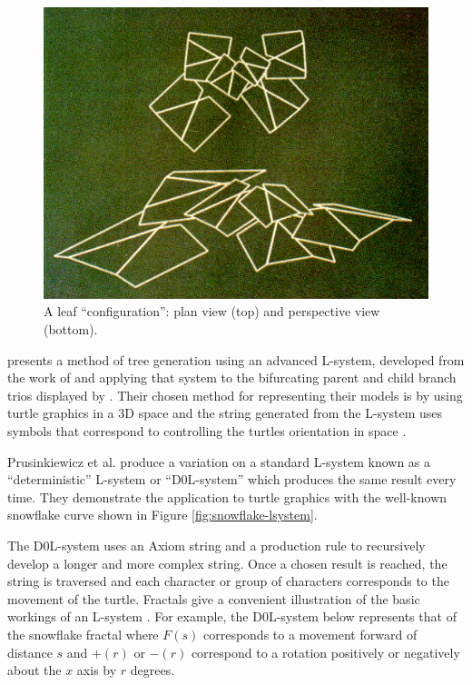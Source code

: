 \documentclass[final]{cmpreport}
\begin{document}
\begin{figure}[ht]
    \includegraphics[scale=0.24]{bloomenthal-leaves.PNG} 
    \centering
    \captionsetup{justification=centering}
    \caption{A leaf ``configuration'': plan view (top) and perspective view (bottom).}
    \label{fig:bloomenthal-leaves}
\end{figure}

\cite{prusinkiewicz1996systems} presents a method of tree generation using an advanced 
L-system, developed from the work of \cite{lindenmayer1968mathematical1} and applying 
that system to the bifurcating parent and child branch trios displayed by \cite{honda1971description}.
Their chosen method for representing their models is by using turtle graphics in a 3D 
space and the string generated from the L-system uses symbols that correspond to controlling 
the turtles orientation in space \citep{szilard1979interpretation,prusinkiewicz1986graphical}.

Prusinkiewicz et al. produce a variation on a standard L-system known as a ``deterministic''
L-system or ``D0L-system'' which produces the same result every time. They demonstrate the 
application to turtle graphics with the well-known snowflake curve \citep{mandelbrot1982fractal,koch1906methode} 
shown in Figure \ref{fig:snowflake-lsystem}.

The D0L-system uses an Axiom string and a production rule to recursively develop a longer and 
more complex string. Once a chosen result is reached, the string is traversed and each character 
or group of characters corresponds to the movement of the turtle. Fractals give a convenient 
illustration of the basic workings of an L-system \citep{prusinkiewicz1986graphical,prusinkiewicz2012algorithmic}. 
For example, the D0L-system below represents that of the snowflake fractal where $F(s)$ 
corresponds to a movement forward of distance $s$ and $+(r)$ or $-(r)$ correspond to a rotation 
positively or negatively about the $x$ axis by $r$ degrees.
\end{document}
